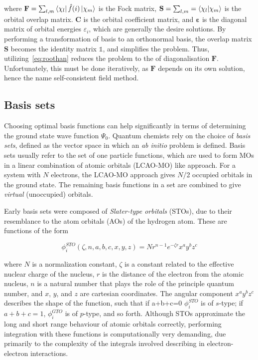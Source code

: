 \noindent where $\mathbf{F} = \sum_{l,m} \bra{\chi_l} \hat{f}(i) \ket{\chi_m}$ is the Fock matrix, $\mathbf{S} = \sum_{l,m} = \bra{\chi_l}\ket{\chi_m}$ is the orbital overlap matrix. $\mathbf{C}$ is the orbital coefficient matrix, and $\mathbf{\varepsilon}$ is the diagonal matrix of orbital energies $\varepsilon_i$, which are generally the desire solutions. By performing a transformation of basis to an orthonormal basis, the overlap matrix $\mathbf{S}$ becomes the identity matrix $\mathbb{1}$, and simplifies the problem. Thus, utilizing~\ref{eq:roothan} reduces the problem to the of diagonalisation $\mathbf{F}$. Unfortunately, this must be done iteratively, as $\mathbf{F}$ depends on its own solution, hence the name self-consistent field method.

\subsection{Basis sets}

Choosing optimal basis functions can help significantly in terms of determining the ground state wave function $\Psi_0$. Quantum chemists rely on the choice of \emph{basis sets}, defined as the vector space in which an \emph{ab initio} problem is defined. Basis sets usually refer to the set of one particle functions, which are used to form MOs in a linear combination of atomic orbitals (LCAO-MO) like approach. For a system with $N$ electrons, the LCAO-MO approach gives $N$/2 occupied orbitals in the ground state. The remaining basis functions in a set are combined to give \emph{virtual} (unoccupied) orbitals.

Early basis sets were composed of \emph{Slater-type orbitals} (STOs), due to their resemblance to the atom orbitals (AOs) of the hydrogen atom. These are functions of the form

\begin{equation}
\phi_i^{STO}(\zeta,n,a,b,c,x,y,z) = Nr^{n-1}e^{-\zeta r}x^a y^b z^c
\end{equation}

\noindent where $N$ is a normalization constant, $\zeta$ is a constant related to the effective nuclear charge of the nucleus, $r$ is the distance of the electron from the atomic nucleus, $n$ is a natural number that plays the role of the principle quantum number, and $x$, $y$, and $z$ are cartesian coordinates. The angular component $x^a y^b z^c$ describes the shape of the function, such that if a+b+c=0 $\phi_i^{STO}$ is of $s$-type; if $a+b+c=1$, $\phi_i^{GTO}$ is of $p$-type, and so forth. Although STOs approximate the long and short range behaviour of atomic orbitals correctly, performing integration with these functions is computationally very demanding, due primarily to the complexity of the integrals involved describing in electron-electron interactions.

